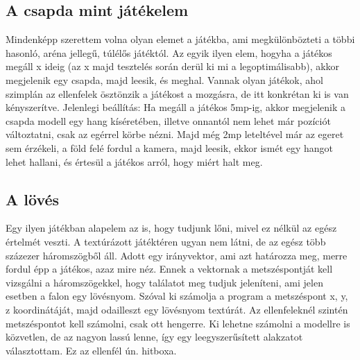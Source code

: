 \subsection{A csapda mint játékelem}

Mindenképp szerettem volna olyan elemet a játékba, ami megkülönbözteti a többi hasonló, aréna jellegű, túlélős játéktól. Az egyik ilyen elem, hogyha a játékos megáll x ideig (az x majd tesztelés során derül ki mi a legoptimálisabb), akkor megjelenik egy csapda, majd leesik, és meghal. Vannak olyan játékok, ahol szimplán az ellenfelek ösztönzik a játékost a mozgásra, de itt konkrétan ki is van kényszerítve. Jelenlegi beállítás:
Ha megáll a játékos 5mp-ig, akkor megjelenik a csapda modell egy hang kíséretében, illetve onnantól nem lehet már pozíciót változtatni, csak az egérrel körbe nézni. Majd még 2mp leteltével már az egeret sem érzékeli, a föld felé fordul a kamera, majd leesik, ekkor ismét egy hangot lehet hallani, és értesül a játékos arról, hogy miért halt meg.

\subsection{A lövés}

Egy ilyen játékban alapelem az is, hogy tudjunk lőni, mivel ez nélkül az egész értelmét veszti. A textúrázott játéktéren ugyan nem látni, de az egész több százezer háromszögből áll. Adott egy irányvektor, ami azt határozza meg, merre fordul épp a játékos, azaz mire néz. Ennek a vektornak a metszéspontját kell vizsgálni a háromszögekkel, hogy találatot meg tudjuk jeleníteni, ami jelen esetben a falon egy lövésnyom. Szóval ki számolja a program a metszéspont x, y, z koordinátáját, majd odailleszt egy lövésnyom textúrát. Az ellenfeleknél szintén metszéspontot kell számolni, csak ott hengerre. Ki lehetne számolni a modellre is közvetlen, de az nagyon lassú lenne, így egy leegyszerűsített alakzatot választottam. Ez az ellenfél ún. hitboxa.
